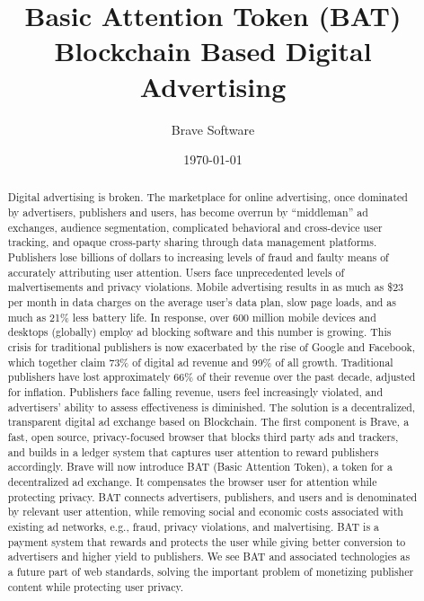 \documentclass[11pt]{article}
\begin{document}
\title{%
Basic Attention Token (BAT) \\[1mm] 
\large Blockchain Based Digital Advertising}
\author{Brave Software}
\date{\today}
\maketitle


\begin{abstract}
Digital advertising is broken. 
The marketplace for online advertising, once dominated by advertisers, publishers and users, has become overrun by ``middleman'' ad exchanges, audience segmentation, complicated behavioral and cross-device user tracking, and opaque cross-party sharing through data management platforms.
Publishers lose billions of dollars to increasing levels of fraud and faulty means of accurately attributing user attention. 
Users face unprecedented levels of malvertisements and privacy violations. Mobile advertising results in as much as \$23 per month in data charges on the average user's data plan, slow page loads, and as much as 21\% less battery life.  
In response, over 600 million mobile devices and desktops (globally) employ ad blocking software and this number is growing. 
This crisis for traditional publishers is now exacerbated by the rise of Google and Facebook, which together claim 73\% of digital ad revenue and 99\% of all growth. 
Traditional publishers have lost approximately 66\% of their revenue over the past decade, adjusted for inflation. 
Publishers face falling revenue, users feel increasingly violated, and advertisers' ability to assess effectiveness is diminished. 
The solution is a decentralized, transparent digital ad exchange based on Blockchain. 
The first component is Brave, a fast, open source, privacy-focused browser that blocks third party ads and trackers, and builds in a ledger system that captures user attention to  reward publishers accordingly. 
Brave will now introduce BAT (Basic Attention Token), a token for a decentralized ad exchange. It compensates the browser user for attention while protecting privacy.
BAT connects advertisers, publishers, and users and is denominated by relevant user attention, while removing social and economic costs associated with existing ad networks, e.g., fraud, privacy violations, and malvertising.
BAT is a payment system that rewards and protects the user while giving better conversion to advertisers and higher yield to publishers.
We see BAT and associated technologies as a future part of web standards, solving the important problem of monetizing publisher content while protecting user privacy. 

\end{abstract}
\pagebreak
\end{document}
